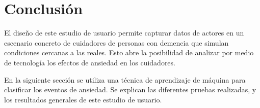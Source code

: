 \section{Conclusi\'on}
El dise\~no de este estudio de usuario permite capturar datos de actores en un escenario concreto de cuidadores de personas con demencia que simulan condiciones cercanas a las reales. Esto abre la posibilidad de analizar por medio de tecnolog\'ia los efectos de ansiedad en los cuidadores.

En la siguiente secci\'on se utiliza una t\'ecnica de aprendizaje de m\'aquina para clasificar los eventos de ansiedad. Se explican las diferentes pruebas realizadas, y los resultados generales de este estudio de usuario.
\newpage

